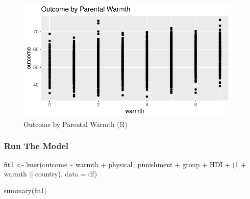 \documentclass[
  letterpaper,
  DIV=11,
  numbers=noendperiod]{scrreprt}
\newenvironment{Shaded}{\begin{snugshade}}{\end{snugshade}}
\newcommand{\AttributeTok}[1]{\textcolor[rgb]{0.40,0.45,0.13}{#1}}
\newcommand{\DecValTok}[1]{\textcolor[rgb]{0.68,0.00,0.00}{#1}}
\newcommand{\FunctionTok}[1]{\textcolor[rgb]{0.28,0.35,0.67}{#1}}
\newcommand{\NormalTok}[1]{\textcolor[rgb]{0.00,0.23,0.31}{#1}}
\newcommand{\OtherTok}[1]{\textcolor[rgb]{0.00,0.23,0.31}{#1}}
\newcommand{\SpecialCharTok}[1]{\textcolor[rgb]{0.37,0.37,0.37}{#1}}
\begin{document}
\begin{figure}[H]

{\centering \includegraphics{index_files/figure-pdf/fig-R-1.pdf}

}

\caption{\label{fig-R}Outcome by Parental Warmth (R)}

\end{figure}

\hypertarget{run-the-model-1}{%
\subsubsection{Run The Model}\label{run-the-model-1}}

\begin{Shaded}
\begin{Highlighting}[]
\NormalTok{fit1 }\OtherTok{\textless{}{-}} \FunctionTok{lmer}\NormalTok{(outcome }\SpecialCharTok{\textasciitilde{}}\NormalTok{ warmth }\SpecialCharTok{+}\NormalTok{ physical\_punishment }\SpecialCharTok{+} 
\NormalTok{               group }\SpecialCharTok{+}\NormalTok{ HDI }\SpecialCharTok{+}
\NormalTok{               (}\DecValTok{1} \SpecialCharTok{+}\NormalTok{ warmth }\SpecialCharTok{||}\NormalTok{ country),}
             \AttributeTok{data =}\NormalTok{ df)}

\FunctionTok{summary}\NormalTok{(fit1)}
\end{Highlighting}
\end{Shaded}
\end{document}
